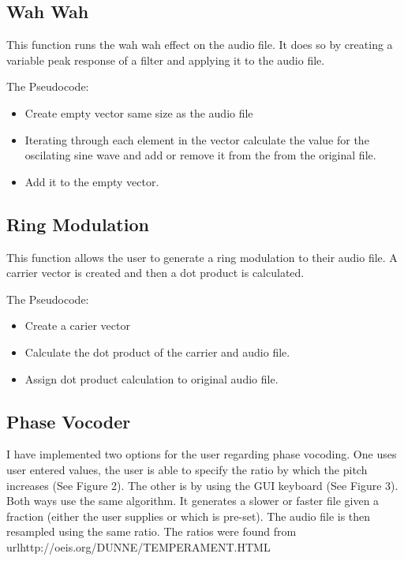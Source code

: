 \documentclass[12pt]{article}
\begin{document}
			\subsection{Wah Wah}
				
				This function runs the wah wah effect on the audio file. It does so by creating a variable peak response of a filter and applying it to the audio file.\newline

				The Pseudocode:

				\begin{itemize}
					\item Create empty vector same size as the audio file
					\item Iterating through each element in the vector calculate the value for the oscilating sine wave and add or remove it from the from the original file.
					\item Add it to the empty vector.
				\end{itemize}

			\subsection{Ring Modulation}

				This function allows the user to generate a ring modulation to their audio file. A carrier vector is created and then a dot product is calculated.\newline  
				
				The Pseudocode:

				\begin{itemize}
					\item Create a carier vector 
					\item Calculate the dot product of the carrier and audio file. 
					\item Assign dot product calculation to original audio file.
				\end{itemize}

			\subsection{Phase Vocoder}

				I have implemented two options for the user regarding phase vocoding. One uses user entered values, the user is able to specify the ratio by which the pitch increases (See Figure 2). The other is by using the GUI keyboard (See Figure 3). Both ways use the same algorithm. It generates a slower or faster file given a fraction (either the user supplies or which is pre-set). The audio file is then resampled using the same ratio. The ratios were found from url{http://oeis.org/DUNNE/TEMPERAMENT.HTML} \newline
\end{document}
